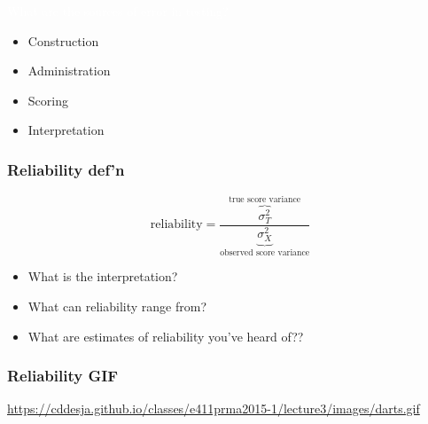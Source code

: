 \documentclass[dvipsnames]{beamer}\usepackage[]{graphicx}\usepackage[]{color}
\begin{document}
{
\begin{frame}
\centering
\Huge \textcolor{white}{What are the sources of error in testing?}
\end{frame}
}

\begin{frame}
\begin{itemize}
  \item Construction
  \item Administration
  \item Scoring
  \item Interpretation
\end{itemize}
\end{frame}

\begin{frame}
\frametitle{Reliability def'n}
$$\text{reliability} = \frac{\overbrace{\sigma^2_T}^{\text{true score variance}}}{\underbrace{\sigma^2_X}_{\text{observed score variance}}}$$

\begin{itemize}
  \item<2-> What is the interpretation?
  \item<3-> What can reliability range from?
  \item<4-> What are estimates of reliability you've heard of??
\end{itemize}
\end{frame}

\begin{frame}
\frametitle{Reliability GIF}
  \url{https://cddesja.github.io/classes/e411prma2015-1/lecture3/images/darts.gif}\footnotemark

\end{frame}
\end{document}
